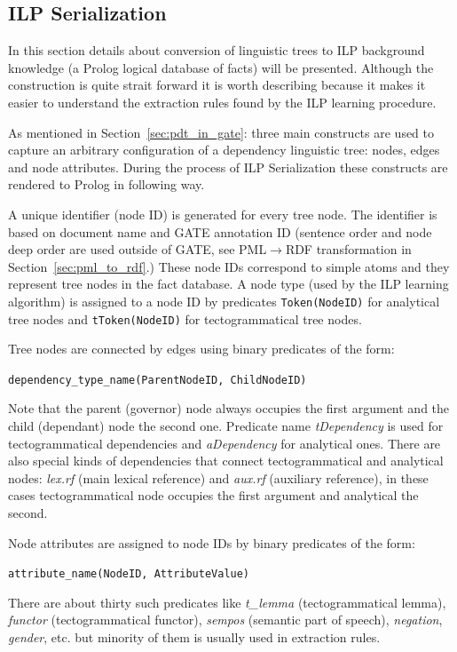 \subsection{ILP Serialization} \label{sec:ilp_serialization}

In this section details about conversion of linguistic trees to ILP background knowledge (a Prolog logical database of facts) will be presented. Although the construction is quite strait forward it is worth describing because it makes it easier to understand the extraction rules found by the ILP learning procedure. 

As mentioned in Section~\ref{sec:pdt_in_gate}: three main constructs are used to capture an arbitrary configuration of a dependency linguistic tree: nodes, edges and node attributes. During the process of ILP Serialization these constructs are rendered to Prolog in following way. 

A unique identifier (node ID) is generated for every tree node. The identifier is based on document name and GATE annotation ID (sentence order and node deep order are used outside of GATE, see PML$\rightarrow$RDF transformation in Section~\ref{sec:pml_to_rdf}.) These node IDs correspond to simple atoms and they represent tree nodes in the fact database. A node type (used by the ILP learning algorithm) is assigned to a node ID by predicates \texttt{Token(NodeID)} for analytical tree nodes and \texttt{tToken(NodeID)} for tectogrammatical tree nodes.

Tree nodes are connected by edges using binary predicates of the form:

\texttt{dependency\_type\_name(ParentNodeID, ChildNodeID)}

\noindent Note that the parent (governor) node always occupies the first argument and the child (dependant) node the second one. Predicate name \emph{tDependency} is used for tectogrammatical dependencies and \emph{aDependency} for analytical ones. There are also special kinds of dependencies that connect tectogrammatical and analytical nodes: \emph{lex.rf} (main lexical reference) and \emph{aux.rf} (auxiliary reference), in these cases tectogrammatical node occupies the first argument and analytical the second.

Node attributes are assigned to node IDs by binary predicates of the form:

\texttt{attribute\_name(NodeID, AttributeValue)}

\noindent There are about thirty such predicates like \emph{t\_lemma} (tectogrammatical lemma), \emph{functor} (tectogrammatical functor), \emph{sempos} (semantic part of speech), \emph{negation}, \emph{gender}, etc. but minority of them is usually used in extraction rules.

